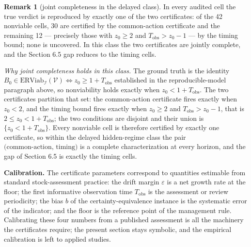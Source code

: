 \documentclass[10pt,twocolumn]{article}
\theoremstyle{definition}
\newtheorem{remark}{Remark}
\begin{document}
\begin{remark}[joint completeness in the delayed class]\label{rem:coverage}
In every audited cell the true verdict is reproduced by exactly one of the two certificates: of the 42 nonviable cells, 30 are certified by the common-action certificate and the remaining 12 --- precisely those with \(z_{0} \ge 2\) and \(T_{\mathrm{obs}} > z_{0} - 1\) --- by the timing bound; none is uncovered. In this class the two certificates are jointly complete, and the Section 6.5 gap reduces to the timing cells.
\end{remark}

\emph{Why joint completeness holds in this class.} The ground truth is the identity \(B_{0} \in \mathrm{ERViab}_{\mathcal{I}}(\mathcal{V}) \iff z_{0} \ge 1 + T_{\mathrm{obs}}\) established in the reproducible-model paragraph above, so nonviability holds exactly when \(z_{0} < 1 + T_{\mathrm{obs}}\). The two certificates partition that set: the common-action certificate fires exactly when \(z_{0} < 2\), and the timing bound fires exactly when \(z_{0} \ge 2\) and \(T_{\mathrm{obs}} > z_{0} - 1\), that is \(2 \le z_{0} < 1 + T_{\mathrm{obs}}\); the two conditions are disjoint and their union is \(\{z_{0} < 1 + T_{\mathrm{obs}}\}\). Every nonviable cell is therefore certified by exactly one certificate, so within the delayed hidden-regime class the pair \(\text{(common-action, timing)}\) is a complete characterization at every horizon, and the gap of Section 6.5 is exactly the timing cells.

\textbf{Calibration.} The certificate parameters correspond to quantities estimable from standard stock-assessment practice: the drift margin \(\varepsilon\) is a net growth rate at the floor; the first informative observation time \(T_{\mathrm{obs}}\) is the assessment or review periodicity; the bias \(b\) of the certainty-equivalence instance is the systematic error of the indicator; and the floor is the reference point of the management rule. Calibrating these four numbers from a published assessment is all the machinery the certificates require; the present section stays symbolic, and the empirical calibration is left to applied studies.
\end{document}
